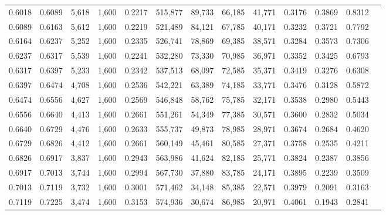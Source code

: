 \begin{tabular}{rrrrrrrrrrrrr}
0.6018 & 0.6089 &  5,618 & 1,600 &                                     0.2217 & 515,877 &  89,733 &  66,185 &  41,771 & 0.3176 & 0.3869 & 0.8312 \\
0.6089 & 0.6163 &  5,612 & 1,600 &                                     0.2219 & 521,489 &  84,121 &  67,785 &  40,171 & 0.3232 & 0.3721 & 0.7792 \\
0.6164 & 0.6237 &  5,252 & 1,600 &                                     0.2335 & 526,741 &  78,869 &  69,385 &  38,571 & 0.3284 & 0.3573 & 0.7306 \\
0.6237 & 0.6317 &  5,539 & 1,600 &                                     0.2241 & 532,280 &  73,330 &  70,985 &  36,971 & 0.3352 & 0.3425 & 0.6793 \\
0.6317 & 0.6397 &  5,233 & 1,600 &                                     0.2342 & 537,513 &  68,097 &  72,585 &  35,371 & 0.3419 & 0.3276 & 0.6308 \\
0.6397 & 0.6474 &  4,708 & 1,600 &                                     0.2536 & 542,221 &  63,389 &  74,185 &  33,771 & 0.3476 & 0.3128 & 0.5872 \\
0.6474 & 0.6556 &  4,627 & 1,600 &                                     0.2569 & 546,848 &  58,762 &  75,785 &  32,171 & 0.3538 & 0.2980 & 0.5443 \\
0.6556 & 0.6640 &  4,413 & 1,600 &                                     0.2661 & 551,261 &  54,349 &  77,385 &  30,571 & 0.3600 & 0.2832 & 0.5034 \\
0.6640 & 0.6729 &  4,476 & 1,600 &                                     0.2633 & 555,737 &  49,873 &  78,985 &  28,971 & 0.3674 & 0.2684 & 0.4620 \\
0.6729 & 0.6826 &  4,412 & 1,600 &                                     0.2661 & 560,149 &  45,461 &  80,585 &  27,371 & 0.3758 & 0.2535 & 0.4211 \\
0.6826 & 0.6917 &  3,837 & 1,600 &                                     0.2943 & 563,986 &  41,624 &  82,185 &  25,771 & 0.3824 & 0.2387 & 0.3856 \\
0.6917 & 0.7013 &  3,744 & 1,600 &                                     0.2994 & 567,730 &  37,880 &  83,785 &  24,171 & 0.3895 & 0.2239 & 0.3509 \\
0.7013 & 0.7119 &  3,732 & 1,600 &                                     0.3001 & 571,462 &  34,148 &  85,385 &  22,571 & 0.3979 & 0.2091 & 0.3163 \\
0.7119 & 0.7225 &  3,474 & 1,600 &                                     0.3153 & 574,936 &  30,674 &  86,985 &  20,971 & 0.4061 & 0.1943 & 0.2841 \\

\end{tabular}
